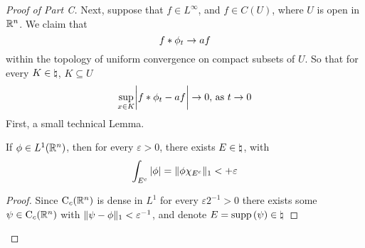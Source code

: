 \documentclass[../../main.tex]{subfiles}
\begin{document}
\begin{proof}[Proof of Part C]
    Next, suppose that $f\in L^\infty$, and $f\in C(U)$, where $U$ is open in $\mathbb{R}^n$. We claim that 
    \[f\ast \phi_t\to af\]
    within the topology of uniform convergence on compact subsets of $U$. So that for every $K\in\natural$, $K\subseteq U$\[\sup_{x\in K}\biggl|f\ast\phi_t-af\biggr|\to 0,\,\text{as }t\to 0\]
    First, a small technical Lemma.
    \begin{lemma}
        If $\phi\in L^1(\mathbb{R}^n)$, then for every $\varepsilon>0$, there exists $E\in\natural$, with
        \[\int_{E^c}|\phi|=\lVert {\phi\chi_{E^c}} \rVert_1<+\varepsilon\]
    \end{lemma}
    \begin{proof}
        Since $\operatorname{C}_c({\mathbb{R}^n})$ is dense in $L^1$ for every $\varepsilon2^{-1}>0$ there exists some $\psi\in\operatorname{C}_c({\mathbb{R}^n})$ with $\lVert {\psi-\phi} \rVert_1<\varepsilon^{-1}$, and denote $E=\operatorname{supp}{(\psi)}\in\natural$
    \end{proof}
\end{proof}
\end{document}

